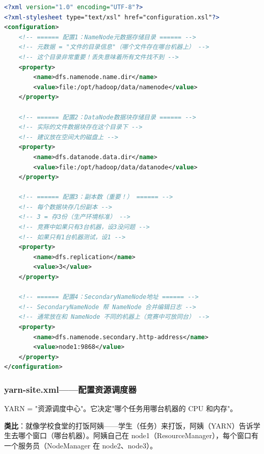 \documentclass[12pt,a4paper]{article}
\begin{document}
\begin{lstlisting}[language=XML]
<?xml version="1.0" encoding="UTF-8"?>
<?xml-stylesheet type="text/xsl" href="configuration.xsl"?>
<configuration>
    <!-- ====== 配置1：NameNode元数据存储目录 ====== -->
    <!-- 元数据 = "文件的目录信息"（哪个文件存在哪台机器上） -->
    <!-- 这个目录非常重要！丢失意味着所有文件找不到 -->
    <property>
        <name>dfs.namenode.name.dir</name>
        <value>file:/opt/hadoop/data/namenode</value>
    </property>
    
    <!-- ====== 配置2：DataNode数据块存储目录 ====== -->
    <!-- 实际的文件数据块存在这个目录下 -->
    <!-- 建议放在空间大的磁盘上 -->
    <property>
        <name>dfs.datanode.data.dir</name>
        <value>file:/opt/hadoop/data/datanode</value>
    </property>
    
    <!-- ====== 配置3：副本数（重要！） ====== -->
    <!-- 每个数据块存几份副本 -->
    <!-- 3 = 存3份（生产环境标准） -->
    <!-- 竞赛中如果只有3台机器，设3没问题 -->
    <!-- 如果只有1台机器测试，设1 -->
    <property>
        <name>dfs.replication</name>
        <value>3</value>
    </property>
    
    <!-- ====== 配置4：SecondaryNameNode地址 ====== -->
    <!-- SecondaryNameNode 帮 NameNode 合并编辑日志 -->
    <!-- 通常放在和 NameNode 不同的机器上（竞赛中可放同台） -->
    <property>
        <name>dfs.namenode.secondary.http-address</name>
        <value>node1:9868</value>
    </property>
</configuration>
\end{lstlisting}

\subsubsection{yarn-site.xml——配置资源调度器}

\begin{knowledgebox}[这个文件是干什么的？]
YARN = "资源调度中心"。它决定"哪个任务用哪台机器的 CPU 和内存"。

\textbf{类比}：就像学校食堂的打饭阿姨——学生（任务）来打饭，阿姨（YARN）告诉学生去哪个窗口（哪台机器）。阿姨自己在 node1（ResourceManager），每个窗口有一个服务员（NodeManager 在 node2、node3）。
\end{knowledgebox}
\end{document}
